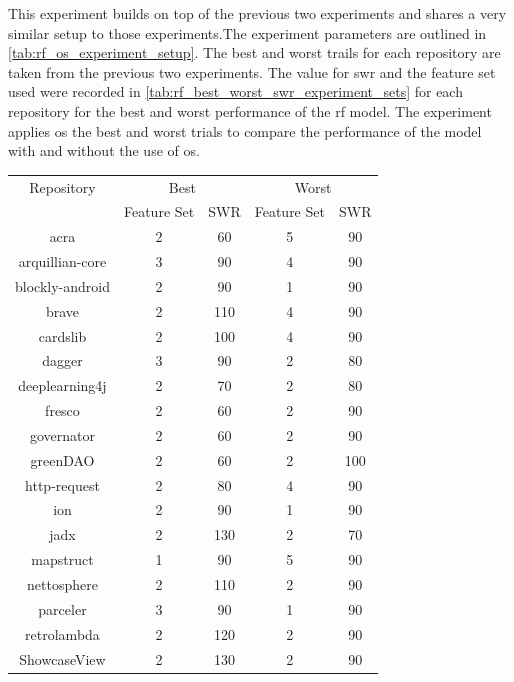 This experiment builds on top of the previous two experiments and shares a very similar setup to those experiments.The experiment parameters are outlined in \autoref{tab:rf_os_experiment_setup}. The best and worst trails for each repository are taken from the previous two experiments. The value for \gls{swr} and the feature set used were recorded in \autoref{tab:rf_best_worst_swr_experiment_sets} for each repository for the best and worst performance of the \gls{rf} model. The experiment applies \gls{os} the best and worst trials to compare the performance of the model with and without the use of \gls{os}.

\begin{table}[ht]
\begin{center}

    \begin{tabular}{|c|c|c|c|c|}
        \hline
        Repository & \multicolumn{2}{c|}{Best} & \multicolumn{2}{c|}{Worst} \\ \cline{2-5}
         & Feature Set & SWR & Feature Set & SWR \\ 
        \hline
        acra & 2 & 60 & 5 & 90 \\
        arquillian-core & 3 & 90 & 4 & 90 \\
        blockly-android & 2 & 90 & 1 & 90 \\
        brave & 2 & 110 & 4 & 90 \\
        cardslib & 2 & 100 & 4 & 90 \\
        dagger & 3 & 90 & 2 & 80 \\
        deeplearning4j & 2 & 70 & 2 & 80 \\
        fresco & 2 & 60 & 2 & 90 \\
        governator & 2 & 60 & 2 & 90 \\
        greenDAO & 2 & 60 & 2 & 100 \\
        http-request & 2 & 80 & 4 & 90 \\
        ion & 2 & 90 & 1 & 90 \\
        jadx & 2 & 130 & 2 & 70 \\
        mapstruct & 1 & 90 & 5 & 90 \\
        nettosphere & 2 & 110 & 2 & 90 \\
        parceler & 3 & 90 & 1 & 90 \\
        retrolambda & 2 & 120 & 2 & 90 \\
        ShowcaseView & 2 & 130 & 2 & 90 \\

\end{tabular}
\end{center}
\end{table}
